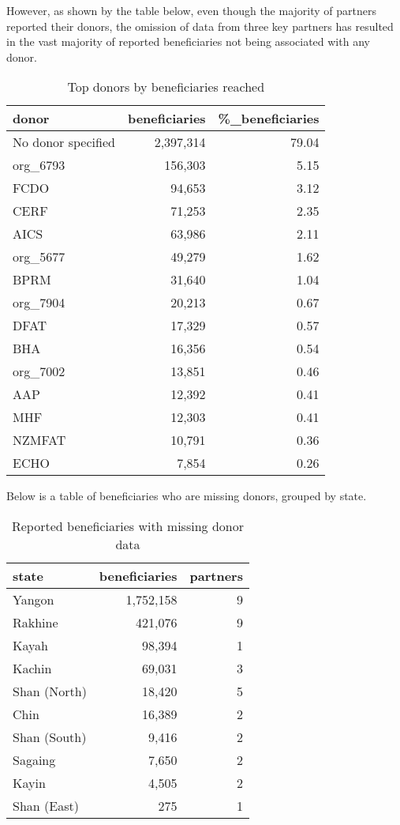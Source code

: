 \documentclass[
]{article}
\begin{document}
However, as shown by the table below, even though the majority of
partners reported their donors, the omission of data from three key
partners has resulted in the vast majority of reported beneficiaries not
being associated with any donor.

\begin{table}

\caption{\label{tab:table-donors-beneficiaries}Top donors by beneficiaries reached}
\centering
\begin{tabular}[t]{l|r|r}
\hline
donor & beneficiaries & \%\_beneficiaries\\
\hline
No donor specified & 2,397,314 & 79.04\\
\hline
org\_6793 & 156,303 & 5.15\\
\hline
FCDO & 94,653 & 3.12\\
\hline
CERF & 71,253 & 2.35\\
\hline
AICS & 63,986 & 2.11\\
\hline
org\_5677 & 49,279 & 1.62\\
\hline
BPRM & 31,640 & 1.04\\
\hline
org\_7904 & 20,213 & 0.67\\
\hline
DFAT & 17,329 & 0.57\\
\hline
BHA & 16,356 & 0.54\\
\hline
org\_7002 & 13,851 & 0.46\\
\hline
AAP & 12,392 & 0.41\\
\hline
MHF & 12,303 & 0.41\\
\hline
NZMFAT & 10,791 & 0.36\\
\hline
ECHO & 7,854 & 0.26\\
\hline
\end{tabular}
\end{table}

Below is a table of beneficiaries who are missing donors, grouped by
state.

\begin{table}

\caption{\label{tab:missing-donor}Reported beneficiaries with missing donor data}
\centering
\begin{tabular}[t]{l|r|r}
\hline
state & beneficiaries & partners\\
\hline
Yangon & 1,752,158 & 9\\
\hline
Rakhine & 421,076 & 9\\
\hline
Kayah & 98,394 & 1\\
\hline
Kachin & 69,031 & 3\\
\hline
Shan (North) & 18,420 & 5\\
\hline
Chin & 16,389 & 2\\
\hline
Shan (South) & 9,416 & 2\\
\hline
Sagaing & 7,650 & 2\\
\hline
Kayin & 4,505 & 2\\
\hline
Shan (East) & 275 & 1\\
\hline
\end{tabular}
\end{table}
\end{document}
